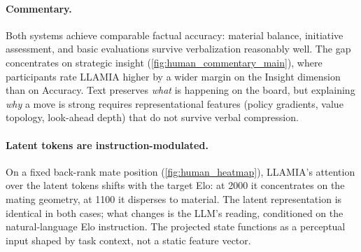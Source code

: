 \paragraph{Commentary.}
Both systems achieve comparable factual accuracy: material balance, initiative assessment, and basic evaluations survive verbalization reasonably well. The gap concentrates on strategic insight (\cref{fig:human_commentary_main}), where participants rate LLAMIA higher by a wider margin on the Insight dimension than on Accuracy. Text preserves \emph{what} is happening on the board, but explaining \emph{why} a move is strong requires representational features (policy gradients, value topology, look-ahead depth) that do not survive verbal compression.

\paragraph{Latent tokens are instruction-modulated.}
On a fixed back-rank mate position (\cref{fig:human_heatmap}), LLAMIA's attention over the latent tokens shifts with the target Elo: at 2000 it concentrates on the mating geometry, at 1100 it disperses to material. The latent representation is identical in both cases; what changes is the LLM's reading, conditioned on the natural-language Elo instruction. The projected state functions as a perceptual input shaped by task context, not a static feature vector.